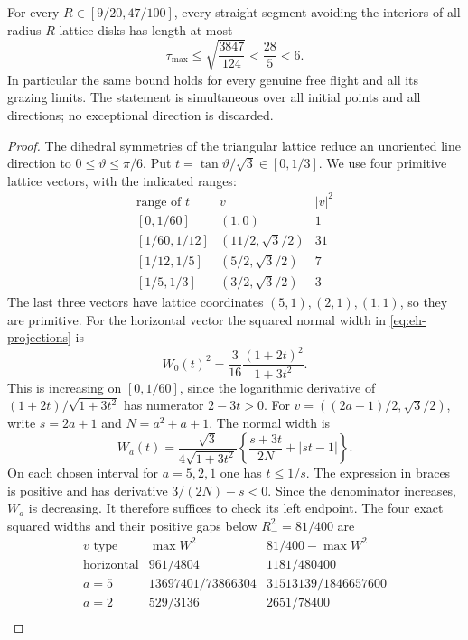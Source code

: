 \begin{theorem}
\label{thm:eh-horizon}
For every $R\in[9/20,47/100]$, every straight segment avoiding the
interiors of all radius-$R$ lattice disks has length at most
\begin{equation}\label{eq:eh-horizon}
 \tau_{\max}\le\sqrt{\frac{3847}{124}}<\frac{28}{5}<6.
\end{equation}
In particular the same bound holds for every genuine free flight and
all its grazing limits. The statement is simultaneous over all initial
points and all directions; no exceptional direction is discarded.
\end{theorem}
\begin{proof}
The dihedral symmetries of the triangular lattice reduce an unoriented
line direction to $0\le\vartheta\le\pi/6$. Put
$t=\tan\vartheta/\sqrt3\in[0,1/3]$. We use four primitive lattice
vectors, with the indicated ranges:
\[
\begin{array}{c|c|c}
\text{range of }t&v&|v|^2\\ \hline
{[0,1/60]}&(1,0)&1\\
{[1/60,1/12]}&(11/2,\sqrt3/2)&31\\
{[1/12,1/5]}&(5/2,\sqrt3/2)&7\\
{[1/5,1/3]}&(3/2,\sqrt3/2)&3
\end{array}
\]
The last three vectors have lattice coordinates $(5,1),(2,1),(1,1)$,
so they are primitive. For the horizontal vector the squared normal
width in \eqref{eq:eh-projections} is
\[
 W_0(t)^2=\frac3{16}\frac{(1+2t)^2}{1+3t^2}.
\]
This is increasing on $[0,1/60]$, since the logarithmic derivative of
$(1+2t)/\sqrt{1+3t^2}$ has numerator $2-3t>0$.
For $v=((2a+1)/2,\sqrt3/2)$, write $s=2a+1$ and
$N=a^2+a+1$. The normal width is
\[
 W_a(t)=\frac{\sqrt3}{4\sqrt{1+3t^2}}
       \left\{\frac{s+3t}{2N}+|st-1|\right\}.
\]
On each chosen interval for $a=5,2,1$ one has $t\le1/s$.
The expression in braces is positive and has derivative
$3/(2N)-s<0$. Since the denominator increases, $W_a$ is decreasing.
It therefore suffices to check its left endpoint. The four exact
squared widths and their positive gaps below $R_-^2=81/400$ are
\[
\begin{array}{c|c|c}
 v\text{ type}&\max W^2&81/400-\max W^2\\ \hline
\text{horizontal}&961/4804&1181/480400\\
a=5&13697401/73866304&31513139/1846657600\\
a=2&529/3136&2651/78400\\

\end{array}\]
\end{proof}
